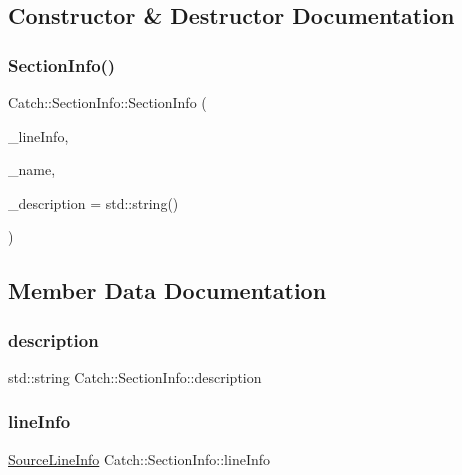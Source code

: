 \subsection{Constructor \& Destructor Documentation}
\hypertarget{struct_catch_1_1_section_info_a27aff3aaf8b6611f3651b17111a272c6}{}\label{struct_catch_1_1_section_info_a27aff3aaf8b6611f3651b17111a272c6} 
\subsubsection{\texorpdfstring{Section\+Info()}{SectionInfo()}}
{\footnotesize\ttfamily Catch\+::\+Section\+Info\+::\+Section\+Info (\begin{DoxyParamCaption}\item[{\hyperlink{struct_catch_1_1_source_line_info}{Source\+Line\+Info} const \&}]{\+\_\+line\+Info,  }\item[{std\+::string const \&}]{\+\_\+name,  }\item[{std\+::string const \&}]{\+\_\+description = {\ttfamily std\+:\+:string()} }\end{DoxyParamCaption})}



\subsection{Member Data Documentation}
\hypertarget{struct_catch_1_1_section_info_a0052060219a6de74bb7ade34d4163a4e}{}\label{struct_catch_1_1_section_info_a0052060219a6de74bb7ade34d4163a4e} 
\subsubsection{\texorpdfstring{description}{description}}
{\footnotesize\ttfamily std\+::string Catch\+::\+Section\+Info\+::description}

\hypertarget{struct_catch_1_1_section_info_adbc83b8a3507c4acc8ee249e93465711}{}\label{struct_catch_1_1_section_info_adbc83b8a3507c4acc8ee249e93465711} 
\subsubsection{\texorpdfstring{line\+Info}{lineInfo}}
{\footnotesize\ttfamily \hyperlink{struct_catch_1_1_source_line_info}{Source\+Line\+Info} Catch\+::\+Section\+Info\+::line\+Info}

